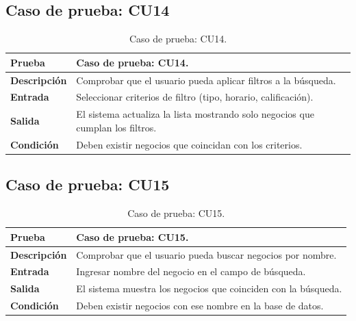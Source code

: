 
\subsection{Caso de prueba: CU14}

\begin{table}[ht]
\centering
\renewcommand{\arraystretch}{1.3}
\begin{tabular}{|p{3cm}|p{12cm}|}
\hline
\rowcolor[RGB]{191,191,191}
\textbf{Prueba} & Caso de prueba: CU14. \\
\hline
\textbf{Descripción} \cellcolor[RGB]{217,217,217} & Comprobar que el usuario pueda aplicar filtros a la búsqueda. \\
\hline
\textbf{Entrada} \cellcolor[RGB]{217,217,217} & Seleccionar criterios de filtro (tipo, horario, calificación). \\
\hline
\textbf{Salida} \cellcolor[RGB]{217,217,217} & El sistema actualiza la lista mostrando solo negocios que cumplan los filtros. \\
\hline
\textbf{Condición} \cellcolor[RGB]{217,217,217} & Deben existir negocios que coincidan con los criterios. \\
\hline
\end{tabular}
\caption{Caso de prueba: CU14.}
\label{tab:cu14_black_test}
\end{table}


\subsection{Caso de prueba: CU15}

\begin{table}[ht]
\centering
\renewcommand{\arraystretch}{1.3}
\begin{tabular}{|p{3cm}|p{12cm}|}
\hline
\rowcolor[RGB]{191,191,191}
\textbf{Prueba} & Caso de prueba: CU15. \\
\hline
\textbf{Descripción} \cellcolor[RGB]{217,217,217} & Comprobar que el usuario pueda buscar negocios por nombre. \\
\hline
\textbf{Entrada} \cellcolor[RGB]{217,217,217} & Ingresar nombre del negocio en el campo de búsqueda. \\
\hline
\textbf{Salida} \cellcolor[RGB]{217,217,217} & El sistema muestra los negocios que coinciden con la búsqueda. \\
\hline
\textbf{Condición} \cellcolor[RGB]{217,217,217} & Deben existir negocios con ese nombre en la base de datos. \\
\hline
\end{tabular}
\caption{Caso de prueba: CU15.}
\label{tab:cu15_black_test}
\end{table}

